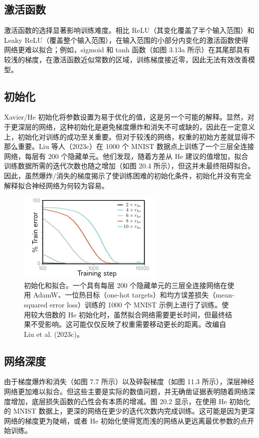 \subsection{激活函数}
激活函数的选择显著影响训练难度。相比 ReLU（其变化覆盖了半个输入范围）和 Leaky ReLU（覆盖整个输入范围），在输入范围的小部分内变化的激活函数使得网络更难以拟合；例如，sigmoid 和 tanh 函数（如图 3.13a 所示）在其尾部具有较浅的梯度，在激活函数近似常数的区域，训练梯度接近零，因此无法有效改善模型。

\subsection{初始化}
Xavier/He 初始化将参数设置为易于优化的值，这是另一个可能的解释。显然，对于更深层的网络，这种初始化是避免梯度爆炸和消失不可或缺的，因此在一定意义上，初始化对训练的成功至关重要。但对于较浅的网络，权重的初始方差就显得不那么重要。Liu 等人（2023c）在 1000 个 MNIST 数据点上训练了一个三层全连接网络，每层有 200 个隐藏单元。他们发现，随着方差从 He 建议的值增加，拟合训练数据所需的迭代次数也随之增加（如图 20.4 所示），但这并未最终阻碍拟合。因此，虽然爆炸/消失的梯度揭示了使训练困难的初始化条件，初始化并没有完全解释拟合神经网络为何较为容易。

\begin{figure}[ht!]
\centering
\includegraphics[width=0.7\linewidth]{png/chapter20/WhyOmniGrok2.png}
\caption{初始化和拟合。一个具有每层 200 个隐藏单元的三层全连接网络在使用 AdamW、一位热目标（one-hot targets）和均方误差损失（mean-squared error loss）训练的 1000 个 MNIST 示例上进行了训练。使用较大倍数的 He 初始化时，虽然拟合网络需要更长时间，但最终结果不受影响。这可能仅仅反映了权重需要移动更长的距离。改编自 Liu et al. (2023c)。}
\end{figure}

\subsection{网络深度}
由于梯度爆炸和消失（如图 7.7 所示）以及碎裂梯度（如图 11.3 所示），深层神经网络更加难以拟合。但这些主要是实际的数值问题，并无确凿证据表明随着网络深度增加，底层损失函数的凸性会有本质的增减。图 20.2 显示，在使用 He 初始化的 MNIST 数据上，更深的网络在更少的迭代次数内完成训练。这可能是因为更深网络的梯度更为陡峭，或者 He 初始化使得宽而浅的网络从更远离最优参数的点开始训练。

